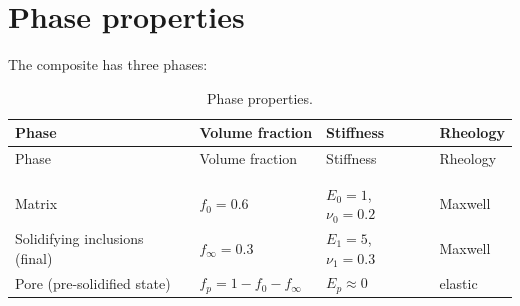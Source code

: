 \documentclass[
  a4paper,
  numbers=noendperiod,
  DIV=12]{scrreprt}
\begin{document}
\section{Phase properties}\label{sec-ageing-phases}

The composite has three phases:

\begin{longtable}[]{@{}
  >{\raggedright\arraybackslash}p{}
  >{\centering\arraybackslash}p{}
  >{\raggedright\arraybackslash}p{}
  >{\raggedright\arraybackslash}p{}@{}}
\toprule\noalign{}
\begin{minipage}[b]{\linewidth}\raggedright
Phase
\end{minipage} & \begin{minipage}[b]{\linewidth}\centering
Volume fraction
\end{minipage} & \begin{minipage}[b]{\linewidth}\raggedright
Stiffness
\end{minipage} & \begin{minipage}[b]{\linewidth}\raggedright
Rheology
\end{minipage} \\
\midrule\noalign{}
\endfirsthead
\toprule\noalign{}
\begin{minipage}[b]{\linewidth}\raggedright
Phase
\end{minipage} & \begin{minipage}[b]{\linewidth}\centering
Volume fraction
\end{minipage} & \begin{minipage}[b]{\linewidth}\raggedright
Stiffness
\end{minipage} & \begin{minipage}[b]{\linewidth}\raggedright
Rheology
\end{minipage} \\
\midrule\noalign{}
\endhead
\bottomrule\noalign{}
\tabularnewline
\caption{Phase properties.}\label{tbl-phases}\tabularnewline
\endlastfoot
Matrix & \(f_0 = 0.6\) & \(E_0=1\), \(\nu_0=0.2\) & Maxwell \\
Solidifying inclusions (final) & \(f_\infty = 0.3\) & \(E_1=5\),
\(\nu_1=0.3\) & Maxwell \\
Pore (pre-solidified state) & \(f_p = 1-f_0-f_\infty\) &
\(E_p \approx 0\) & elastic \\
\end{longtable}
\end{document}
